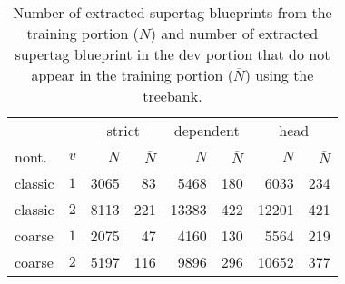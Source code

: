 \documentclass[../../document.tex]{subfiles}
\begin{document}
    \subsection{}
    \begin{table}
        \caption{\label{tbl:experiments:tiger:size}
        Number of extracted supertag blueprints from the training portion ($N$) and number of extracted supertag blueprint in the dev portion that do not appear in the training portion ($\overline{N}$) using the \tiger{} treebank.
        }
        \centering
        \setlength{\tabcolsep}{4pt}
        \vspace{.2cm}
        \begin{tabular}{lc|rr|rr|rr}
            \toprule     
            &        & \multicolumn{2}{c|}{strict} & \multicolumn{2}{c|}{dependent} & \multicolumn{2}{c}{head}  \\
  nont.   &\(v\)   & $N$ & $\overline{N}$ & $N$ & $\overline{N}$ & $N$ & $\overline{N}$ \\ \hline
   classic & \(1\)  & 3065 &  83 &  5468 & 180 &  6033 & 234  \\
   classic & \(2\)  & 8113 & 221 & 13383 & 422 & 12201 & 421   \\
   coarse  & \(1\)  & 2075 &  47 &  4160 & 130 &  5564 & 219      \\
   coarse  & \(2\)  & 5197 & 116 &  9896 & 296 & 10652 & 377  \\
    \bottomrule
        \end{tabular}
    \end{table}
\end{document}
